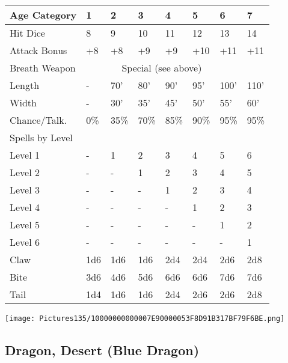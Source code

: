 \documentclass[a4paper,twoside,openany,10pt]{book}
\begin{document}
\begin{multicols}{2}
\begin{flushleft}
\begin{tabularx}{0.47\textwidth}{@{}lXXXXXXX@{}}
	Age Category & 1 & 2 & 3 & 4 & 5 & 6 & 7 \\\hline
	Hit Dice & 8 & 9 & 10 & 11 & 12 & 13 & 14 \\\hline
	Attack Bonus & +8 & +8 & +9 & +9 & +10 & +11 & +11 \\\hline
	Breath Weapon &  \multicolumn{6}{c}{Special (see above)}\\\hline
	Length & - & 70' & 80' & 	90' & 95' & 100' &	110' \\\hline
	Width & - & 30' & 35' & 	45' & 50' & 55' &	60' \\\hline
	Chance/Talk. & 0\% & 35\% & 70\% & 85\% & 90\% & 95\% & 95\% \\\hline
	Spells by Level & & & & & & & \\\hline
	Level 1 & - & 1 & 2 & 3 & 4 & 5 & 6 \\\hline
	Level 2 & - & - & 1 & 2 & 3 & 4 & 5 \\\hline
	Level 3 & - & - & - & 1 & 2 & 3 & 4 \\\hline
	Level 4 & - & - & - & - & 1 & 2 & 3 \\\hline
	Level 5 & - & - & - & - & - & 1 & 2 \\\hline
	Level 6 & - & - & - & - & - & - & 1 \\\hline
	Claw & 1d6 & 1d6 & 1d6 & 2d4 & 2d4 & 2d6 & 2d8 \\\hline
	Bite & 3d6 & 4d6 & 5d6 & 6d6 & 6d6 & 7d6 & 7d6 \\\hline
	Tail & 1d4 & 1d6 & 1d6 & 2d4 & 2d6 & 2d6 & 2d8 \\\hline
\end{tabularx}
\end{flushleft}

\vfill

\begin{center}
	\texttt{[image: Pictures135/10000000000007E90000053F8D91B317BF79F6BE.png]}
\end{center}

\pagebreak


\subsection*{Dragon, Desert (Blue Dragon)}\label{dragon-desert-blue-dragon}


\end{multicols}
\end{document}
